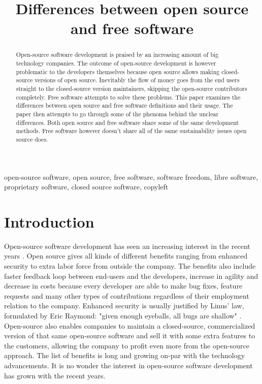 \documentclass[conference]{IEEEtran}
\begin{document}
\title{Differences between open source and free software}

\author{
}

\maketitle

\begin{abstract}
Open-source software development is praised by an increasing amount of big technology companies. The outcome of open-source development is however problematic to the developers themselves because open source allows making closed-source versions of open source. Inevitably the flow of money goes from the end users straight to the closed-source version maintainers, skipping the open-source contributors completely. Free software attempts to solve these problems. This paper examines the differences between open source and free software definitions and their usage. The paper then attempts to go through some of the phenoma behind the unclear differences. Both open source and free software share some of the same development methods. Free software however doesn't share all of the same sustainability issues open source does.
\end{abstract}

\begin{IEEEkeywords}
	open-source software, open source, free software, software freedom, libre software, proprietary software, closed source software, copyleft
\end{IEEEkeywords}

\section{Introduction}
Open-source software development has seen an increasing interest in the recent years \cite{openvsclosed}. Open source gives all kinds of different benefits ranging from enhanced security to extra labor force from outside the company. The benefits also include faster feedback loop between end-users and the developers, increase in agility and decrease in costs because every developer are able to make bug fixes, feature requests and many other types of contributions regardless of their employment relation to the company. Enhanced security is usually justified by Linus' law, formulated by Eric Raymond: "given enough eyeballs, all bugs are shallow" \cite{raymond1999cathedral}.
Open-source also enables companies to maintain a closed-source, commercialized version of that same open-source software and sell it with some extra features to the customers, allowing the company to profit even more from the open-source approach. The list of benefits is long and growing on-par with the technology advancements. It is no wonder the interest in open-source software development has grown with the recent years.
\end{document}
